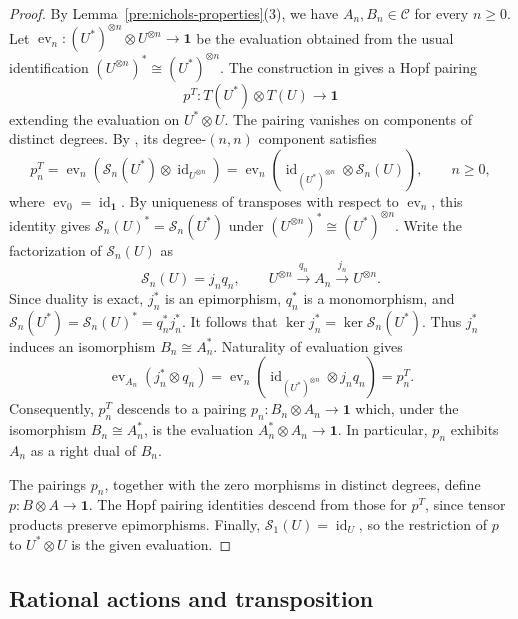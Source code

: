 \documentclass[11pt, a4paper]{article}
\numberwithin{equation}{section}
\newcommand{\C}{\mathcal C}
\newcommand{\one}{\mathbf 1}
\DeclareMathOperator{\id}{id}
\begin{document}
\begin{proof}

By Lemma~\ref{pre:nichols-properties}(3), we have
$A_n,B_n\in\C$ for every $n\geq0$.
Let
$
 \operatorname{ev}_n:
 (U^*)^{\otimes n}\otimes U^{\otimes n}\longrightarrow\one
$
be the evaluation obtained from the usual identification
$(U^{\otimes n})^*\cong(U^*)^{\otimes n}$.
The construction in
\cite[Section~5.5 and Remark~5.6]{nicholscatdef}
gives a Hopf pairing
\[
 p^T:T(U^*)\otimes T(U)\longrightarrow\one
\]
extending the evaluation on $U^*\otimes U$.
The pairing vanishes on components of distinct degrees.
By \cite[Section~5.5]{nicholscatdef}, its degree-$(n,n)$
component satisfies
\[
 p_n^T
 =\operatorname{ev}_n
   (\mathcal S_n(U^*)\otimes\id_{U^{\otimes n}})
 =\operatorname{ev}_n
   (\id_{(U^*)^{\otimes n}}\otimes\mathcal S_n(U)),
 \qquad n\geq0,
\]
where $\operatorname{ev}_0=\id_{\one}$.
By uniqueness of transposes with respect to $\operatorname{ev}_n$,
this identity gives
$\mathcal S_n(U)^*=\mathcal S_n(U^*)$
under $(U^{\otimes n})^*\cong(U^*)^{\otimes n}$.
Write the factorization of $\mathcal S_n(U)$ as
\[
 \mathcal S_n(U)=j_nq_n,\qquad
 U^{\otimes n}\xrightarrow{\ q_n\ }A_n
                  \xrightarrow{\ j_n\ }U^{\otimes n}.
\]
Since duality is exact, $j_n^*$ is an epimorphism,
$q_n^*$ is a monomorphism, and
$
 \mathcal S_n(U^*)=\mathcal S_n(U)^*=q_n^*j_n^*.
$
It follows that
$
 \ker j_n^*=\ker\mathcal S_n(U^*).
$
Thus $j_n^*$ induces an isomorphism $B_n\cong A_n^*$.
Naturality of evaluation gives
\[
 \operatorname{ev}_{A_n}(j_n^*\otimes q_n)
 =\operatorname{ev}_n
       (\id_{(U^*)^{\otimes n}}\otimes j_nq_n)
 =p_n^T.
\]
Consequently, $p_n^T$ descends to a pairing
$
 p_n:B_n\otimes A_n\longrightarrow\one
$
which, under the isomorphism $B_n\cong A_n^*$,
is the evaluation $A_n^*\otimes A_n\to\one$.
In particular, $p_n$ exhibits $A_n$ as a right dual of $B_n$.

The pairings $p_n$, together with the zero morphisms in distinct
degrees, define $p:B\otimes A\to\one$.
The Hopf pairing identities descend from those for $p^T$,
since tensor products preserve epimorphisms.
Finally, $\mathcal S_1(U)=\id_U$, so the restriction of $p$
to $U^*\otimes U$ is the given evaluation.
\end{proof}

\subsection{Rational actions and transposition}
\end{document}

